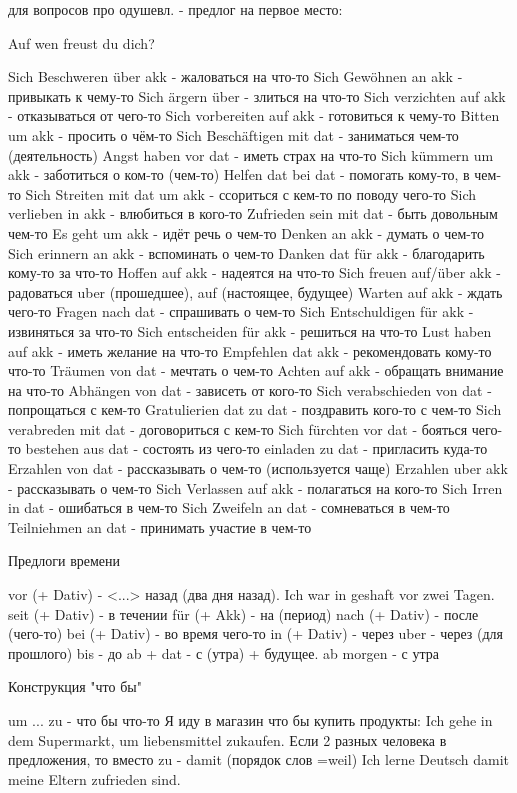 \documentclass[12pt]{report}
\begin{document}
для вопросов про одушевл. - предлог на первое место:

Auf wen freust du dich?

Sich Beschweren über akk - жаловаться на что-то
Sich Gewöhnen an akk - привыкать к чему-то
Sich ärgern über - злиться на что-то
Sich verzichten auf akk - отказываться от чего-то
Sich vorbereiten auf akk - готовиться к чему-то
Bitten um akk - просить о чём-то
Sich Beschäftigen mit dat - заниматься чем-то (деятельность)
Angst haben vor dat - иметь страх на что-то
Sich kümmern um akk - заботиться о ком-то (чем-то)
Helfen dat bei dat - помогать кому-то, в чем-то
Sich Streiten mit dat um akk - ссориться с кем-то по поводу чего-то
Sich verlieben in akk - влюбиться в кого-то
Zufrieden sein mit dat - быть довольным чем-то
Es geht um akk - идёт речь о чем-то
Denken an akk - думать о чем-то
Sich erinnern an akk - вспоминать о чем-то
Danken dat für akk - благодарить кому-то за что-то
Hoffen auf akk - надеятся на что-то
Sich freuen auf/über akk - радоваться uber (прошедшее), auf (настоящее, будущее)
Warten auf akk - ждать чего-то
Fragen nach dat - спрашивать о чем-то
Sich Entschuldigen für akk - извиняться за что-то
Sich entscheiden für akk - решиться на что-то
Lust haben auf akk - иметь желание на что-то
Empfehlen dat akk - рекомендовать кому-то что-то
Träumen von dat - мечтать о чем-то
Achten auf akk - обращать внимание на что-то
Abhängen von dat - зависеть от кого-то
Sich verabschieden von dat - попрощаться с кем-то
Gratulierien dat zu dat - поздравить кого-то с чем-то
Sich verabreden mit dat - договориться с кем-то
Sich fürchten vor dat - бояться чего-то
bestehen aus dat - состоять из чего-то
einladen zu dat - пригласить куда-то
Erzahlen von dat - рассказывать о чем-то (используется чаще)
Erzahlen uber akk - рассказывать о чем-то 
Sich Verlassen auf akk - полагаться на кого-то
Sich Irren in dat - ошибаться в чем-то
Sich Zweifeln an dat - сомневаться в чем-то
Teilniehmen an dat - принимать участие в чем-то

Предлоги времени

vor (+ Dativ) - <...> назад (два дня назад). Ich war in geshaft vor zwei Tagen.
seit (+ Dativ) - в течении 
für (+ Akk) - на (период)
nach (+ Dativ) - после (чего-то)
bei (+ Dativ) - во время чего-то
in (+ Dativ) - через
uber - через (для прошлого)
bis - до 
ab + dat - с (утра) + будущее. ab morgen - с утра

Конструкция "что бы"

um ... zu - что бы что-то
Я иду в магазин что бы купить продукты: Ich gehe in dem Supermarkt, um liebensmittel zukaufen.
Если 2 разных человека в предложения, то вместо zu - damit (порядок слов =weil)
Ich lerne Deutsch damit meine Eltern zufrieden sind.
\end{document}
